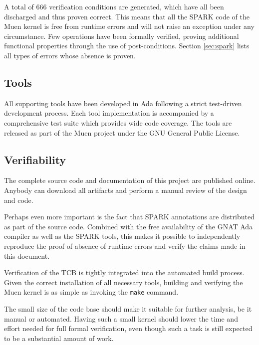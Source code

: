 A total of 666 verification conditions are generated, which have all been
discharged and thus proven correct. This means that all the SPARK code of the
Muen kernel is free from runtime errors and will not raise an exception under
any circumstance. Few operations have been formally verified, proving additional
functional properties through the use of post-conditions. Section
\ref{sec:spark} lists all types of errors whose absence is proven.

\subsection{Tools}
All supporting tools have been developed in Ada following a strict test-driven
development process. Each tool implementation is accompanied by a comprehensive
test suite which provides wide code coverage. The tools are released as part of
the Muen project under the GNU General Public License.

\subsection{Verifiability}
The complete source code and documentation of this project are published online.
Anybody can download all artifacts and perform a manual review of the design and
code.

Perhaps even more important is the fact that SPARK annotations are distributed
as part of the source code. Combined with the free availability of the GNAT Ada
compiler as well as the SPARK tools, this makes it possible to independently
reproduce the proof of absence of runtime errors and verify the claims made in
this document.

Verification of the TCB is tightly integrated into the automated build process.
Given the correct installation of all necessary tools, building and verifying
the Muen kernel is as simple as invoking the \texttt{make} command.

The small size of the code base should make it suitable for further analysis, be
it manual or automated. Having such a small kernel should lower the time and
effort needed for full formal verification, even though such a task is still
expected to be a substantial amount of work.
